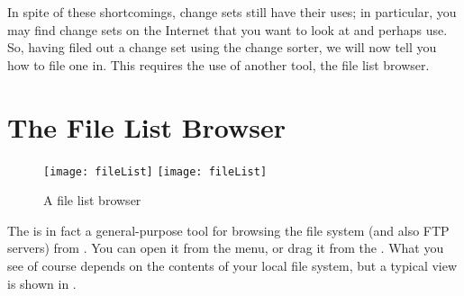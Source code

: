 \documentclass[a4paper,10pt,twoside]{book}
\begin{document}
In spite of these shortcomings, change sets still have their uses; in particular, you may find change sets on the Internet that you want to look at and perhaps use.
So, having filed out a change set using the change sorter, we will now tell you how to file one in.
This requires the use of another tool, the file list browser.


\section{The File List Browser}

\begin{figure}[btp]
	\begin{center}
	\ifluluelse
		{\texttt{[image: fileList]}}
		{\texttt{[image: fileList]}}
	\end{center}
	\caption{A file list browser}
	\label{fig:fileList}
\end{figure}

The  is in fact a general-purpose tool for browsing the file system (and also FTP servers) from \sq. 
You can open it from the  menu, or drag it from the \toolsflapind.
What you see of course depends on the contents of your local file system, but a typical view is shown in .
\end{document}
